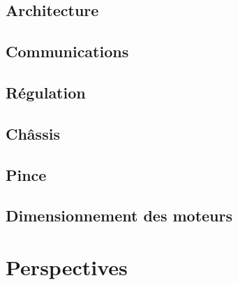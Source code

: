 \documentclass[a4paper ,11pt]{report}
\begin{document}
\newpage
\section{Architecture}


\newpage
\section{Communications}


\newpage
\section{Régulation}


\newpage
\section{Châssis}


\newpage
\section{Pince}


\newpage
\section{Dimensionnement des moteurs}


\newpage
\chapter{Perspectives}

\end{document}
